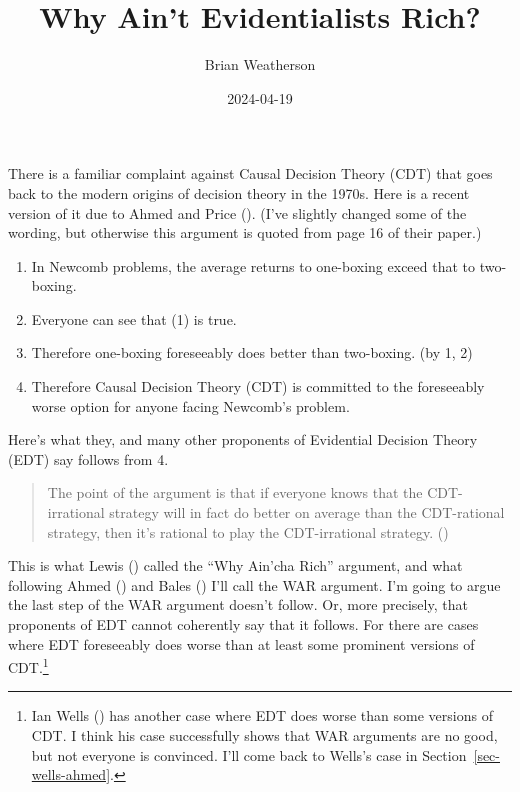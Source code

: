 \documentclass[
  10pt,
  letterpaper,
  DIV=11,
  numbers=noendperiod,
  twoside]{scrartcl}
\title{Why Ain't Evidentialists Rich?}
\author{Brian Weatherson}
\date{2024-04-19}
\providecommand{\tightlist}{%
  \setlength{\itemsep}{0pt}\setlength{\parskip}{0pt}}\usepackage{longtable,booktabs,array}
\begin{document}
\maketitle

\newcommand{\mytitle}{title}
\newcommand{\myauthor}{author}

There is a familiar complaint against Causal Decision Theory (CDT) that
goes back to the modern origins of decision theory in the 1970s. Here is
a recent version of it due to Ahmed and Price
(). (I've slightly changed some of
the wording, but otherwise this argument is quoted from page 16 of their
paper.)

\begin{enumerate}
\def\labelenumi{\arabic{enumi}.}
\tightlist
\item
  In Newcomb problems, the average returns to one-boxing exceed that to
  two-boxing.
\item
  Everyone can see that (1) is true.
\item
  Therefore one-boxing foreseeably does better than two-boxing. (by 1,
  2)
\item
  Therefore Causal Decision Theory (CDT) is committed to the foreseeably
  worse option for anyone facing Newcomb's problem.
\end{enumerate}

Here's what they, and many other proponents of Evidential Decision
Theory (EDT) say follows from 4.

\begin{quote}
The point of the argument is that if everyone knows that the
CDT-irrational strategy will in fact do better on average than the
CDT-rational strategy, then it's rational to play the CDT-irrational
strategy. ()
\end{quote}

This is what Lewis () called the ``Why
Ain'cha Rich'' argument, and what following Ahmed
() and Bales
() I'll call the WAR argument. I'm going
to argue the last step of the WAR argument doesn't follow. Or, more
precisely, that proponents of EDT cannot coherently say that it follows.
For there are cases where EDT foreseeably does worse than at least some
prominent versions of CDT.\footnote{Ian Wells
  () has another case where EDT does worse
  than some versions of CDT. I think his case successfully shows that
  WAR arguments are no good, but not everyone is convinced. I'll come
  back to Wells's case in Section~\ref{sec-wells-ahmed}.}
\end{document}

